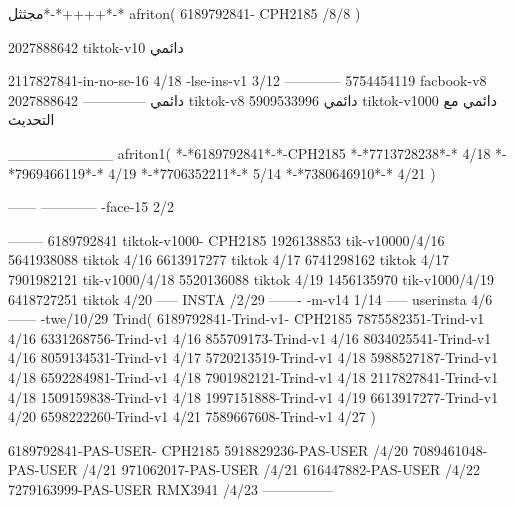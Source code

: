 مجثثل*-*++++*-*
afriton(
6189792841- CPH2185  /8/8
)

2027888642 tiktok-v10
دائمي

2117827841-in-no-se-16 4/18
-lse-ins-v1 3/12
------------
5754454119 facbook-v8
دائمي
--------------
2027888642 tiktok-v8
دائمي
5909533996 tiktok-v1000
دائمي مع التحديث

__________
afriton1(
*-*6189792841*-*-CPH2185
*-*7713728238*-* 4/18
*-*7969466119*-* 4/19
*-*7706352211*-* 5/14
*-*7380646910*-* 4/21
)


------
------------
-face-15 2/2

--------
6189792841 tiktok-v1000- CPH2185 
1926138853 tik-v10000/4/16
5641938088 tiktok 4/16
6613917277 tiktok 4/17
6741298162 tiktok 4/17
7901982121 tik-v1000/4/18
5520136088 tiktok 4/19
1456135970 tik-v1000/4/19
6418727251 tiktok 4/20
-----
 INSTA /2/29
-------
-m-v14 1/14
-----
userinsta 4/6
------
-twe/10/29
Trind(
6189792841-Trind-v1- CPH2185 
7875582351-Trind-v1  4/16
6331268756-Trind-v1  4/16
855709173-Trind-v1  4/16
8034025541-Trind-v1  4/16
8059134531-Trind-v1  4/17
5720213519-Trind-v1  4/18
5988527187-Trind-v1  4/18
6592284981-Trind-v1  4/18
7901982121-Trind-v1  4/18
2117827841-Trind-v1  4/18
1509159838-Trind-v1  4/18
1997151888-Trind-v1  4/19
6613917277-Trind-v1  4/20
6598222260-Trind-v1  4/21
7589667608-Trind-v1  4/27
)

6189792841-PAS-USER- CPH2185 
5918829236-PAS-USER /4/20
7089461048-PAS-USER /4/21
971062017-PAS-USER /4/21
616447882-PAS-USER /4/22
7279163999-PAS-USER  RMX3941 /4/23
    ---------------

